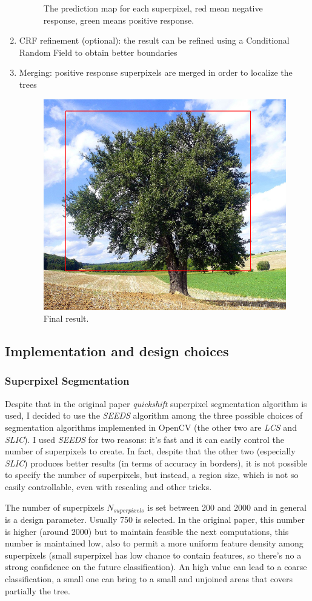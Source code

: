 \documentclass[a4paper,titlepaget]{article}
\begin{document}
\begin{enumerate}
\begin{figure}[htpb]
		\caption{\centering The prediction map for each superpixel, red  mean
        negative response, green means positive response.}
	\end{figure}
    \item CRF refinement (optional): the result can be refined using a Conditional Random Field
        to obtain better boundaries
    \item Merging: positive response superpixels are merged in order to localize
        the trees
	\begin{figure}[htpb]
		\centering
		\includegraphics[width=.6\textwidth]{images/result}
        \caption{\centering Final result.}
	\end{figure}
\end{enumerate}


\subsection{Implementation and design choices}
\subsubsection{Superpixel Segmentation}
Despite that in the original paper \emph{quickshift} superpixel segmentation algorithm is used, I decided to use the \emph{SEEDS} algorithm among the three possible choices of segmentation algorithms implemented in OpenCV (the other two are \emph{LCS} and \emph{SLIC}). I used \emph{SEEDS} for two reasons: it's fast and it can easily control the number of superpixels to create. In fact, despite that the other two (especially \emph{SLIC}) produces better results (in terms of accuracy in borders), it is not possible to specify the number of superpixels, but instead, a region size, which is not so easily controllable, even with rescaling and other tricks.

The number of superpixels $N_{superpixels}$ is set between 200 and 2000 and in general is a design parameter. Usually 750 is selected. In the original paper, this number is higher (around 2000) but to maintain feasible the next computations, this number is maintained low, also to permit a more uniform feature density among superpixels (small superpixel has low chance to contain features, so there's no a strong confidence on the future classification). An high value can lead to a coarse classification, a small one can bring to a small and unjoined areas that covers partially the tree.
\end{document}

